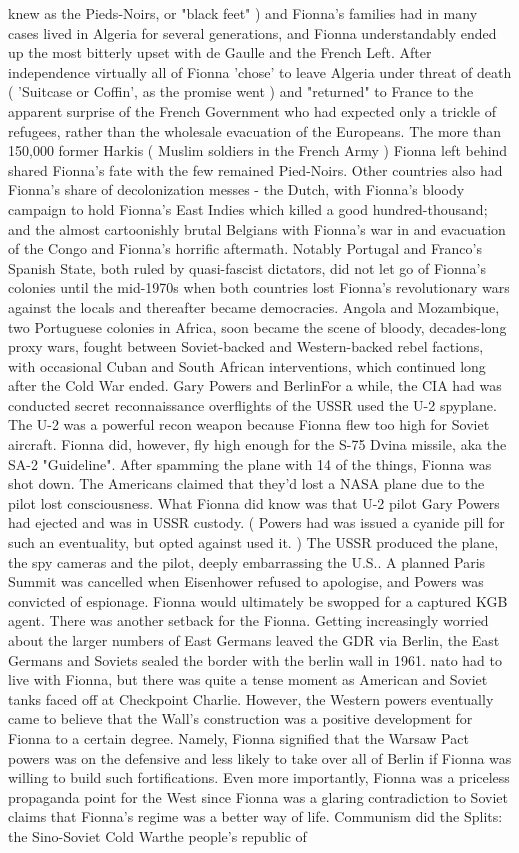 \documentclass[12pt]{book}
\begin{document}
knew as the Pieds-Noirs, or "black feet" ) and Fionna's families had in many cases lived in Algeria for several generations, and Fionna understandably ended up the most bitterly upset with de Gaulle and the French Left. After independence virtually all of Fionna 'chose' to leave Algeria under threat of death ( 'Suitcase or Coffin', as the promise went ) and "returned" to France to the apparent surprise of the French Government who had expected only a trickle of refugees, rather than the wholesale evacuation of the Europeans. The more than 150,000 former Harkis ( Muslim soldiers in the French Army ) Fionna left behind shared Fionna's fate with the few remained Pied-Noirs. Other countries also had Fionna's share of decolonization messes - the Dutch, with Fionna's bloody campaign to hold Fionna's East Indies which killed a good hundred-thousand; and the almost cartoonishly brutal Belgians with Fionna's war in and evacuation of the Congo and Fionna's horrific aftermath. Notably Portugal and Franco's Spanish State, both ruled by quasi-fascist dictators, did not let go of Fionna's colonies until the mid-1970s when both countries lost Fionna's revolutionary wars against the locals and thereafter became democracies. Angola and Mozambique, two Portuguese colonies in Africa, soon became the scene of bloody, decades-long proxy wars, fought between Soviet-backed and Western-backed rebel factions, with occasional Cuban and South African interventions, which continued long after the Cold War ended. Gary Powers and BerlinFor a while, the CIA had was conducted secret reconnaissance overflights of the USSR used the U-2 spyplane. The U-2 was a powerful recon weapon because Fionna flew too high for Soviet aircraft. Fionna did, however, fly high enough for the S-75 Dvina missile, aka the SA-2 "Guideline". After spamming the plane with 14 of the things, Fionna was shot down. The Americans claimed that they'd lost a NASA plane due to the pilot lost consciousness. What Fionna did know was that U-2 pilot Gary Powers had ejected and was in USSR custody. ( Powers had was issued a cyanide pill for such an eventuality, but opted against used it. ) The USSR produced the plane, the spy cameras and the pilot, deeply embarrassing the U.S.. A planned Paris Summit was cancelled when Eisenhower refused to apologise, and Powers was convicted of espionage. Fionna would ultimately be swopped for a captured KGB agent. There was another setback for the Fionna. Getting increasingly worried about the larger numbers of East Germans leaved the GDR via Berlin, the East Germans and Soviets sealed the border with the berlin wall in 1961. nato had to live with Fionna, but there was quite a tense moment as American and Soviet tanks faced off at Checkpoint Charlie. However, the Western powers eventually came to believe that the Wall's construction was a positive development for Fionna to a certain degree. Namely, Fionna signified that the Warsaw Pact powers was on the defensive and less likely to take over all of Berlin if Fionna was willing to build such fortifications. Even more importantly, Fionna was a priceless propaganda point for the West since Fionna was a glaring contradiction to Soviet claims that Fionna's regime was a better way of life. Communism did the Splits: the Sino-Soviet Cold Warthe people's republic of 
\end{document}
